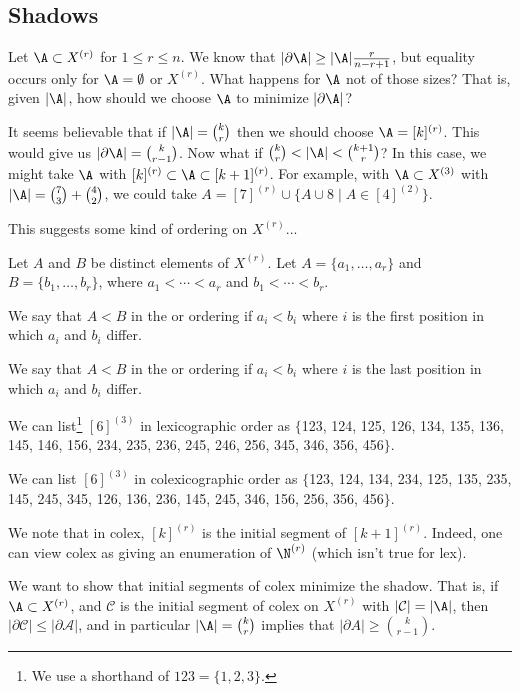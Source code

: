 \subsection{Shadows}

Let $\A \subset X^{(r)}$ for $1 \leq r \leq n$. We know that $|\partial \A| \geq |\A| \frac{r}{n - r + 1}$, but equality occurs only for $\A = \emptyset$ or $X^{(r)}$. What happens for $\A$ not of those sizes? That is, given $|\A|$, how should we choose $\A$ to minimize $|\partial \A|$?

It seems believable that if $|\A| = \binom{k}{r}$ then we should choose $\A = [k]^{(r)}$. This would give us $|\partial \A| = \binom{k}{r - 1}$. Now what if $\binom{k}{r} < |\A| < \binom{k + 1}{r}$? In this case, we might take $\A$ with $[k]^{(r)} \subset \A \subset [k+1]^{(r)}$. For example, with $\A \subset X^{(3)}$ with $|\A| = \binom{7}{3} + \binom{4}{2}$, we could take $A = [7]^{(r)} \cup \{A \cup 8 \mid A \in [4]^{(2)}\}$.

This suggests some kind of ordering on $X^{(r)}$...

\begin{definition}[Ordering $X^{(r)}$]
    Let $A$ and $B$ be distinct elements of $X^{(r)}$. Let $A = \{a_1, \dots, a_r\}$ and $B = \{b_1, \dots, b_r\}$, where $a_1 < \cdots < a_r$ and $b_1 < \cdots < b_r$.

    We say that $A < B$ in the  or  ordering if 
    $a_i < b_i$ where $i$ is the first position in which $a_i$ and $b_i$ differ.

    We say that $A < B$ in the  or  ordering if $a_i < b_i$ where $i$ is the last position in which $a_i$ and $b_i$ differ.
\end{definition}

\begin{example}
We can list\footnote{We use a shorthand of $123 = \{1, 2, 3\}$.} $[6]^{(3)}$ in lexicographic order as $\{$123, 124, 125, 126, 134, 135, 136, 145, 146, 156, 234, 235, 236, 245, 246, 256, 345, 346, 356, 456$\}$.
\end{example}

\begin{example}
We can list $[6]^{(3)}$ in colexicographic order as $\{$123, 124, 134, 234, 125, 135, 235, 145, 245, 345, 126, 136, 236, 145, 245, 346, 156, 256, 356, 456$\}$.
\end{example}

We note that in colex, $[k]^{(r)}$ is the initial segment of $[k + 1]^{(r)}$. Indeed, one can view colex as giving an enumeration of $\N^{(r)}$ (which isn't true for lex). 

We want to show that initial segments of colex minimize the shadow. That is, if $\A \subset X^{(r)}$, and $\mathcal{C}$ is the initial segment of colex on $X^{(r)}$ with $|\mathcal{C}| = |\A|$, then $|\partial \mathcal{C}| \leq |\partial \mathcal{A}|$, and in particular $|\A| = \binom{k}{r}$ implies that $|\partial A| \geq \binom{k}{r - 1}$.

